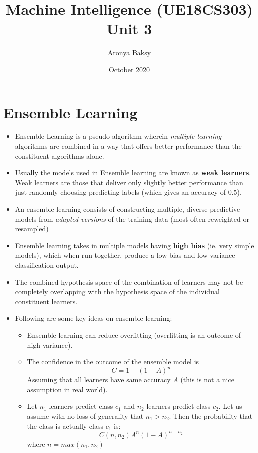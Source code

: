 \documentclass{article}
\title{Machine Intelligence (UE18CS303) \\
\large Unit 3}
\author{Aronya Baksy}
\date{October 2020}
\theoremstyle{plain}
\theoremstyle{definition}
\begin{document}
    \maketitle
\section{Ensemble Learning}
\begin{itemize}
    \item Ensemble Learning is a pseudo-algorithm wherein \textit{multiple learning} algorithms are combined in a way that offers better performance than the constituent algorithms alone. 
    
    \item Usually the models used in Ensemble learning are known as \textbf{weak learners}. Weak learners are those that deliver only slightly better performance than just randomly choosing predicting labels (which gives an accuracy of 0.5). 
    
    \item An ensemble learning consists of constructing multiple, diverse predictive models from \textit{adapted versions} of the training data (most often reweighted or resampled)
    
    \item Ensemble learning takes in multiple models having \textbf{high bias} (ie. very simple models), which when run together, produce a low-bias and low-variance classification output. 
    
    \item The combined hypothesis space of the combination of learners may not be completely overlapping with the hypothesis space of the individual constituent learners.
    
    \item Following are some key ideas on ensemble learning:
    \begin{itemize}
        \item Ensemble learning can reduce overfitting (overfitting is an outcome of high variance). 
         
        \item The confidence in the outcome of the ensemble model is
        \begin{equation*}
            C = 1 - (1-A)^n
        \end{equation*}
        Assuming that all learners have same accuracy $A$ (this is not a nice assumption in real world). 
        
        \item Let $n_1$ learners predict class $c_1$ and $n_2$ learners predict class  $c_2$. Let us assume with no loss of generality that $n_1 > n_2$. Then the probability that the class is actually class $c_1$ is:
        \begin{equation*}
            C(n, n_2) A^n (1-A)^{n-n_2}
        \end{equation*}
        where $n = max(n_1, n_2)$
        

\end{itemize}
\end{itemize}
\end{document}
